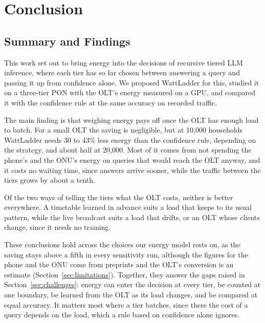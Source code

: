 \documentclass[cic,dipl,english]{infufrgs}
\begin{document}
\chapter{Conclusion}
\label{chap:conclusion}

\section{Summary and Findings}
\label{sec:findings}

This work set out to bring energy into the decisions of recursive tiered LLM inference, where
each tier has so far chosen between answering a query and passing it up from confidence alone.
We proposed WattLadder for this, studied it on a three-tier PON with the OLT's energy measured
on a GPU, and compared it with the confidence rule at the same accuracy on recorded traffic.

The main finding is that weighing energy pays off once the OLT has enough load to batch. For a
small OLT the saving is negligible, but at 10,000 households WattLadder needs 30 to 43\% less
energy than the confidence rule, depending on the strategy, and about half at 20,000. Most of
it comes from not spending the phone's and the ONU's energy on queries that would reach the OLT
anyway, and it costs no waiting time, since answers arrive sooner, while the traffic between
the tiers grows by about a tenth.

Of the two ways of telling the tiers what the OLT costs, neither is better everywhere. A
timetable learned in advance suits a load that keeps to its usual pattern, while the live
broadcast suits a load that drifts, or an OLT whose clients change, since it needs no training.

These conclusions hold across the choices our energy model rests on, as the saving stays above
a fifth in every sensitivity run, although the figures for the phone and the ONU come from
preprints and the OLT's conversion is an estimate (Section~\ref{sec:limitations}). Together,
they answer the gaps raised in Section~\ref{sec:challenges}: energy can enter the decision at
every tier, be counted at one boundary, be learned from the OLT as its load changes, and be
compared at equal accuracy. It matters most where a tier batches, since there the cost of a
query depends on the load, which a rule based on confidence alone ignores.
\end{document}
